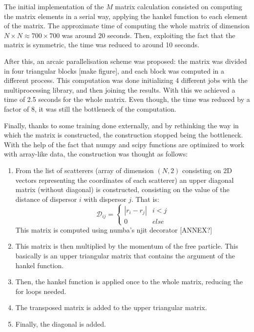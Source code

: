 The initial implementation of the $M$ matrix calculation consisted on computing the matrix elements in a serial way, applying the hankel function to each element of the matrix. The approximate time of computing the whole matrix of dimension $N\times N \approx 700\times 700$ was around 20 seconds. Then, exploiting the fact that the matrix is symmetric, the time was reduced to around 10 seconds.

After this, an arcaic parallelisation scheme was proposed: the matrix was divided in four triangular blocks [make figure], and each block was computed in a different process. This computation was done initializing 4 different jobs with the multiprocessing library, and then joining the results. With this we achieved a time of 2.5 seconds for the whole matrix. Even though, the time was reduced by a factor of 8, it was still the bottleneck of the computation.

Finally, thanks to some training done externally, and by rethinking the way in which the matrix is constructed, the construction stopped being the bottleneck. With the help of the fact that numpy and scipy functions are optimized to work with array-like data, the construction was thought as follows:

\begin{enumerate}
    \item From the list of scatterers (array of dimension $(N,2)$ consisting on 2D vectors representing the coordinates of each scatterer) an upper diagonal matrix (without diagonal) is constructed, consisting on the value of the distance of dispersor $i$ with dispersor $j$. That is:
    \begin{equation}
        \mathcal{D}_{ij}=\begin{cases}
            |r_i-r_j|& i<j\\
            0&else
        \end{cases}
    \end{equation}
    This matrix is computed using numba's njit decorator [ANNEX?]
    \item This matrix is then multiplied by the momentum of the free particle. This basically is an upper triangular matrix that contains the argument of the hankel function.
    \item Then, the hankel function is applied once to the whole matrix, reducing the for loops needed.
    \item The transposed matrix is added to the upper triangular matrix.
    \item Finally, the diagonal is added.
\end{enumerate}

